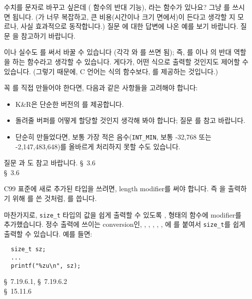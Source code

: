 \begin{faq}
	수치를 문자로 바꾸고 싶은데 ( 함수의 반대 기능),
	라는 함수가 있나요?
\A
	그냥 를 쓰시면 됩니다.  (가 너무
	복잡하고, 큰 비용(시간이나 크기 면에서)이 든다고 생각할 지
	모르나, 사실 효과적으로 동작합니다.) 질문 에 대한 답변에
	나온 예를 보기 바랍니다.  질문 을 참고하기 바랍니다.

	이나 실수도 를 써서 바꿀 수 있습니다
	(각각 와 를 쓰면 됨); 즉, 를 
        이나 의 반대 역할을 하는 함수라고 생각할 수 있습니다.
        게다가, 어떤 식으로 출력할 것인지도 제어할 수 있습니다. (그렇기 때문에,
        C 언어는  식의 함수보다, 를 제공하는 것입니다.)
        
        꼭 를 직접 만들어야 한다면, 다음과 같은 사항들을 고려해야 합니다:
        \begin{itemize}
          \item K\&R은 단순한 버전의 를 제공합니다.
          \item 돌려줄 버퍼를 어떻게 할당할 것인지 생각해 봐야 합니다;
            질문 를 참고 바랍니다.
          \item 단순히 만들었다면, 보통 가장 적은 음수(\verb+INT_MIN+,
            보통 -32,768 또는 -2,147,483,648)를 올바르게 처리하지 못할
            수도 있습니다.
        \end{itemize}

        질문 과 도 참고 바랍니다.
\R
	\cite{kr1} \S\ 3.6  \\
	\cite{kr2} \S\ 3.6 

\T
	C99 표준에 새로 추가된  타입을 쓰려면,  length
        modifier를 써야 합니다. 즉 을 출력하기 위해 를
        쓴 것처럼, 를 씁니다.

        마찬가지로, \verb+size_t+ 타입의 값을 쉽게 출력할 수 있도록 
        ,  형태의
        함수에  modifier를 추가했습니다. 정수 출력에 쓰이는 conversion인,
        , , , , , 에 를 붙여서
        \verb+size_t+를 쉽게 출력할 수 있습니다.  예를 들면:
\begin{verbatim}
  size_t sz;
  ...
  printf("%zu\n", sz);
\end{verbatim}
\R
	\cite{c99} \S\ 7.19.6.1, \S\ 7.19.6.2 \\
	\cite{hs5} \S\ 15.11.6
\end{faq}

